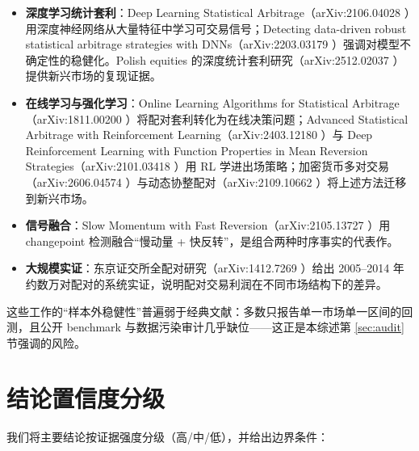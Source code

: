\documentclass[11pt,a4paper]{ctexart}
\begin{document}
\begin{itemize}
  \item \textbf{深度学习统计套利}：Deep Learning Statistical Arbitrage（arXiv:2106.04028 \cite{arxiv_dl_sa}）用深度神经网络从大量特征中学习可交易信号；Detecting data-driven robust statistical arbitrage strategies with DNNs（arXiv:2203.03179 \cite{arxiv_robust_sa}）强调对模型不确定性的稳健化。Polish equities 的深度统计套利研究（arXiv:2512.02037 \cite{arxiv_poland_sa}）提供新兴市场的复现证据。
  \item \textbf{在线学习与强化学习}：Online Learning Algorithms for Statistical Arbitrage（arXiv:1811.00200 \cite{arxiv_online_sa}）将配对套利转化为在线决策问题；Advanced Statistical Arbitrage with Reinforcement Learning（arXiv:2403.12180 \cite{arxiv_rl_sa}）与 Deep Reinforcement Learning with Function Properties in Mean Reversion Strategies（arXiv:2101.03418 \cite{arxiv_rl_mr}）用 RL 学进出场策略；加密货币多对交易（arXiv:2606.04574 \cite{arxiv_crypto_drl}）与动态协整配对（arXiv:2109.10662 \cite{arxiv_crypto_coint}）将上述方法迁移到新兴市场。
  \item \textbf{信号融合}：Slow Momentum with Fast Reversion（arXiv:2105.13727 \cite{arxiv_slowfast}）用 changepoint 检测融合“慢动量 + 快反转”，是组合两种时序事实的代表作。
  \item \textbf{大规模实证}：东京证交所全配对研究（arXiv:1412.7269 \cite{arxiv_tse}）给出 2005--2014 年约数万对配对的系统实证，说明配对交易利润在不同市场结构下的差异。
\end{itemize}

这些工作的“样本外稳健性”普遍弱于经典文献：多数只报告单一市场单一区间的回测，且公开 benchmark 与数据污染审计几乎缺位——这正是本综述第 \ref{sec:audit} 节强调的风险。




\section{结论置信度分级}\label{sec:confidence}

我们将主要结论按证据强度分级（高/中/低），并给出边界条件：
\end{document}
